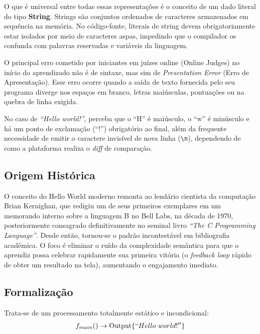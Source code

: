 \documentclass{article}
\begin{document}
O que é universal entre todas essas representações é o conceito de um dado literal do tipo \textbf{String}. Strings são conjuntos ordenados de caracteres armazenados em sequência na memória. No código-fonte, literais de string devem obrigatoriamente estar isolados por meio de caracteres aspas, impedindo que o compilador os confunda com palavras reservadas e variáveis da linguagem.

\begin{warnbox}
O principal erro cometido por iniciantes em juízes online (Online Judges) no início do aprendizado não é de sintaxe, mas sim de \textit{Presentation Error} (Erro de Apresentação). Esse erro ocorre quando a saída de texto fornecida pelo seu programa diverge nos espaços em branco, letras maiúsculas, pontuações ou na quebra de linha exigida. 

No caso de \textit{``Hello world!''}, perceba que o ``H'' é maiúsculo, o ``w'' é minúsculo e há um ponto de exclamação (``!'') obrigatório ao final, além da frequente necessidade de emitir o caractere invisível de nova linha (\verb|\n|), dependendo de como a plataforma realiza o \textit{diff} de comparação.
\end{warnbox}

\subsection*{Origem Histórica}

O conceito do Hello World moderno remonta ao lendário cientista da computação Brian Kernighan, que redigiu um de seus primeiros exemplares em um memorando interno sobre a linguagem B no Bell Labs, na década de 1970, posteriormente consagrado definitivamente no seminal livro \textit{``The C Programming Language''}. Desde então, tornou-se o padrão incontestável em bibliografia acadêmica. O foco é eliminar o ruído da complexidade semântica para que o aprendiz possa celebrar rapidamente sua primeira vitória (o \textit{feedback loop} rápido de obter um resultado na tela), aumentando o engajamento imediato.

\subsection*{Formalização}
Trata-se de um processamento totalmente estático e incondicional:
\begin{align*}
    f_{main}() \rightarrow \text{Output} \lbrace ``Hello\ world!'' \rbrace
\end{align*}
\end{document}
